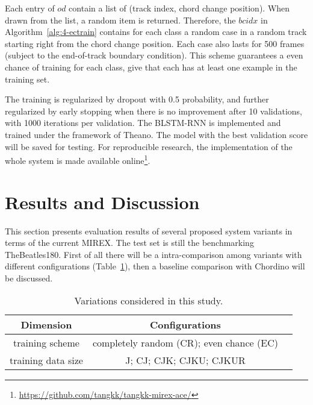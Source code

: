 Each entry of $od$ contain a list of (track index, chord change position). When drawn from the list, a random item is returned. Therefore, the $bcidx$ in Algorithm~\ref{alg:4-ectrain} contains for each class a random case in a random track starting right from the chord change position. Each case also lasts for 500 frames (subject to the end-of-track boundary condition). This scheme guarantees a even chance of training for each class, give that each has at least one example in the training set.

The training is regularized by dropout with 0.5 probability, and further regularized by early stopping when there is no improvement after 10 validations, with 1000 iterations per validation. The BLSTM-RNN is implemented and trained under the framework of Theano. The model with the best validation score will be saved for testing. For reproducible research, the implementation of the whole system is made available online\footnote{\url{https://github.com/tangkk/tangkk-mirex-ace/}}.

\section{Results and Discussion}\label{sec:4-eval}
This section presents evaluation results of several proposed system variants in terms of the current MIREX. The test set is still the benchmarking TheBeatles180. First of all there will be a intra-comparison among variants with different configurations (Table~\ref{tab:4-varexplore}), then a baseline comparison with Chordino will be discussed.

\begin{table}
\caption{Variations considered in this study.}
\centering
\footnotesize
\begin{tabular}{|c|c|c|} \hline
Dimension & Configurations \\ \hline
training scheme & completely random (CR); even chance (EC) \\ \hline
training data size & J; CJ; CJK; CJKU; CJKUR \\ \hline
\end{tabular}
\label{tab:4-varexplore}
\end{table}

